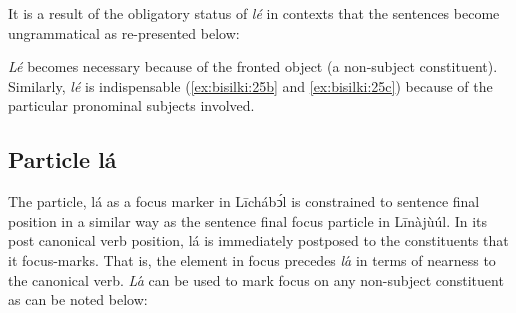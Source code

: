 \documentclass[output=paper,colorlinks,citecolor=brown]{langscibook}
\begin{document}
It is a result of the obligatory status of \textit{lé} in contexts  that the sentences  become ungrammatical as re-presented  below:

\ea%
    \label{ex:bisilki:25}
    \z
\z

\textit{Lé}  becomes necessary because of the fronted object (a non-subject constituent). Similarly, \textit{lé} is indispensable (\ref{ex:bisilki:25b} and \ref{ex:bisilki:25c}) because of the particular pronominal subjects involved.

\subsection{Particle lá }\label{sec:bisilki:7.2}

The particle, lá as a focus marker in Līchábͻ́l is constrained to sentence final position in a similar way as the sentence final focus particle in Līnàjùúl. In its post canonical verb position, lá is immediately postposed to the constituents that it focus-marks. That is, the element in focus precedes \textit{la}́ in terms of nearness to the canonical verb. \textit{La}́ can be used to mark focus on any non-subject constituent as can be noted  below:
\end{document}
